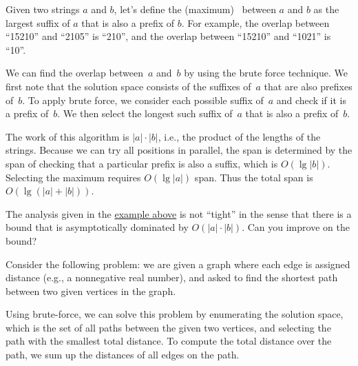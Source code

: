 \begin{cluster}
\label{grp:ex:design::bf::overlaps}

\begin{example}
\label{ex:design::bf::overlaps}
  Given two strings $a$ and $b$, let's define the
  (maximum)~ between $a$ and $b$ as the largest suffix
  of $a$ that is also a prefix of $b$. For example, the overlap
  between ``15210'' and ``2105'' is ``210'', and the overlap between
  ``15210'' and ``1021'' is ``10''.

We can find the overlap between~$a$ and~$b$ by using the brute force
technique.
We first note that the solution space consists of the suffixes of~$a$
that are also prefixes of~$b$.
To apply brute force, we consider each possible suffix of~$a$ and
check if it is a prefix of~$b$.
We then select the longest such suffix of~$a$ that is also a prefix
of~$b$.

The work of this algorithm is $|a| \cdot |b|$, i.e., the product of
the lengths of the strings. 
Because we can try all positions in
parallel, the span is determined by the span of checking that a particular prefix is also a suffix, which is $O(\lg{|b|})$.  
Selecting the maximum requires  $O(\lg{|a|})$ span.
Thus the total span is $O(\lg{(|a| + |b|)})$.

\end{example}
\end{cluster}

\begin{cluster}
\label{grp:xrcs:design::basics::analysis}

\begin{exercise}
\label{xrcs:design::basics::analysis}
The analysis given in the \href{ex:design::bf::overlaps}{example above} is not ``tight'' in the sense that there is a bound that is asymptotically dominated by
$O(|a| \cdot |b|)$.  
Can you improve on the bound? 

\end{exercise}
\end{cluster}

\begin{cluster}
\label{grp:ex:design::bf::shortest-paths}

\begin{example}
\label{ex:design::bf::shortest-paths}
Consider the following problem: we are given a graph where each edge
is assigned distance (e.g., a nonnegative real number), and asked to find
the shortest path between two given vertices in the graph.

Using brute-force, we can solve this problem by enumerating the
solution space, which is the set of all paths between the given two
vertices, and selecting the path with the smallest total distance.
To compute the total distance over the path, we sum up the distances
of all edges on the path.

\end{example}
\end{cluster}

